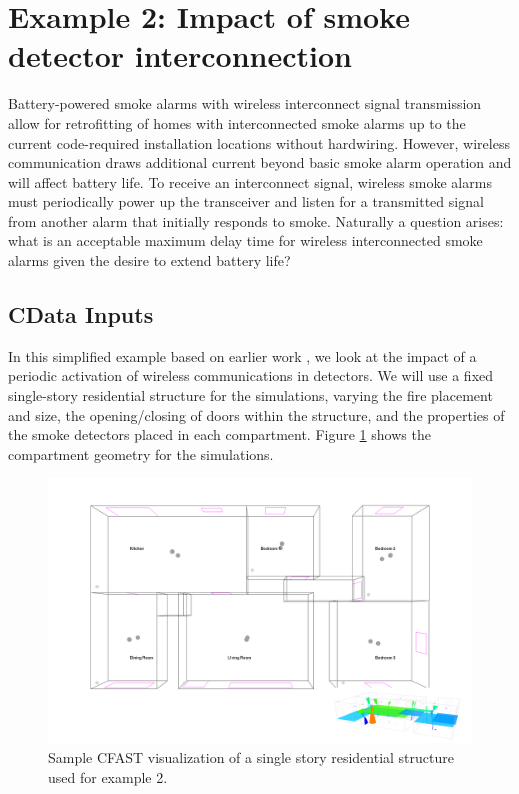 \documentclass[12pt,twoside]{book}
\begin{document}
%
%

\section{Example 2: Impact of smoke detector interconnection}

Battery-powered smoke alarms with wireless interconnect signal transmission allow for retrofitting of homes with interconnected smoke alarms up to the current code-required installation locations without hardwiring. However, wireless communication draws additional current beyond basic smoke alarm operation and will affect battery life. To receive an interconnect signal, wireless smoke alarms must periodically power up the transceiver and listen for a transmitted signal from another alarm that initially responds to smoke. Naturally a question arises: what is an acceptable maximum delay time for wireless interconnected smoke alarms given the desire to extend battery life?

\subsection{CData Inputs}
In this simplified example based on earlier work \cite{Cleary_2019}, we look at the impact of a periodic activation of wireless communications in detectors. We will use a fixed single-story residential structure for the simulations, varying the fire placement and size, the opening/closing of doors within the structure, and the properties of the smoke detectors placed in each compartment. Figure \ref{detector_geometry} shows the compartment geometry for the simulations.

\begin{figure}[h!]
\centering
\includegraphics[width=6.5in]{FIGURES/Detectors.png}
\caption{Sample CFAST visualization of a single story residential structure used for example 2.}
\label{detector_geometry}
\end{figure}
\end{document}
